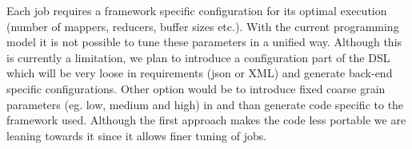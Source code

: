 Each job requires a framework specific configuration for its optimal execution (number of mappers, reducers, buffer sizes etc.). With the current programming model it is not possible to tune these parameters in a unified way. Although this is currently a limitation, we plan to introduce a configuration part of the DSL which will be very loose in requirements (json or XML) and generate back-end specific configurations. Other option would be to introduce fixed coarse grain parameters (eg. low, medium and high) in \tool and than generate code specific to the framework used. Although the first approach makes the code less portable we are leaning towards it since it allows finer tuning of jobs.  